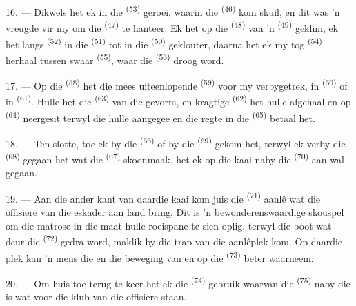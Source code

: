 \VUsaut{3.0mm}
\VUsaut{3.0mm}

16. --- Dikwels het ek in die  \textsuperscript{(53)} geroei, waarin die
 \textsuperscript{(46)} kom skuil, en dit was 'n vreugde vir my om die
 \textsuperscript{(47)} te hanteer. Ek het op die 
\textsuperscript{(48)} van 'n  \textsuperscript{(49)} geklim, ek het
langs  \textsuperscript{(52)} in die  \textsuperscript{(51)} tot
in die  \textsuperscript{(50)} geklouter, daarna het ek my tog
 \textsuperscript{(54)} herhaal tussen swaar 
\textsuperscript{(55)}, waar die  \textsuperscript{(56)} droog word.

17. --- Op die  \textsuperscript{(58)} het die mees uiteenlopende
 \textsuperscript{(59)} voor my verbygetrek, in 
\textsuperscript{(60)} of in  \textsuperscript{(61)}. Hulle het die
 \textsuperscript{(63)} van die  gevorm, en kragtige
 \textsuperscript{(62)} het hulle afgehaal en op 
\textsuperscript{(64)} neergesit terwyl die  hulle aangegee en die
regte in die  \textsuperscript{(65)} betaal het.

18. --- Ten slotte, toe ek by die  \textsuperscript{(66)} of by die
 \textsuperscript{(69)} gekom het, terwyl ek verby die
 \textsuperscript{(68)} gegaan het wat die 
\textsuperscript{(67)} skoonmaak, het ek op die kaai naby die 
\textsuperscript{(70)} aan wal gegaan.

19. --- Aan die ander kant van daardie kaai kom juis die 
\textsuperscript{(71)} aanlê wat die offisiere van die eskader aan land bring. Dit is 'n
bewonderenswaardige skouspel om die matrose in die maat hulle roeispane te sien oplig,
terwyl die boot wat deur die  \textsuperscript{(72)} gedra word, maklik by
die trap van die aanlêplek kom. Op daardie plek kan 'n mens die  en die
beweging van  en  op die  \textsuperscript{(73)}
beter waarneem.

\VUsaut{3.0mm}
\VUsaut{3.0mm}

20. --- Om huis toe terug te keer het ek die 
\textsuperscript{(74)} gebruik waarvan die  \textsuperscript{(75)} naby die
 is wat voor die klub van die offisiere staan.

